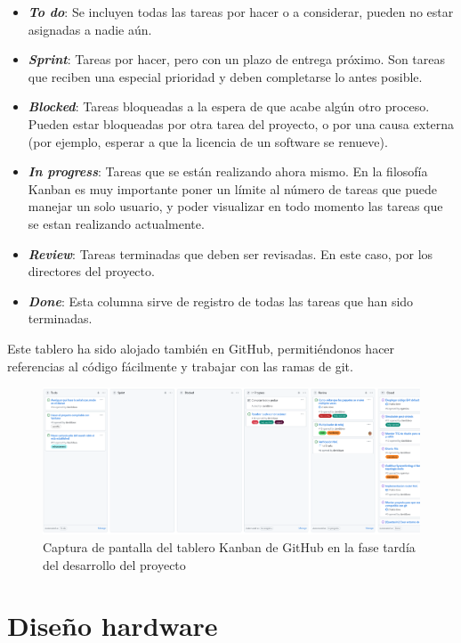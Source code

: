 \begin{itemize}
    \item \textbf{\textit{To do}}: Se incluyen todas las tareas por hacer o a considerar, pueden no estar asignadas a nadie aún.
    \item \textbf{\textit{Sprint}}: Tareas por hacer, pero con un plazo de entrega próximo. Son tareas que reciben una especial prioridad y deben completarse lo antes posible.
    \item \textbf{\textit{Blocked}}: Tareas bloqueadas a la espera de que acabe algún otro proceso. Pueden estar bloqueadas por otra tarea del proyecto, o por una causa externa (por ejemplo, esperar a que la licencia de un software se renueve).
    \item \textbf{\textit{In progress}}: Tareas que se están realizando ahora mismo. En la filosofía Kanban es muy importante poner un límite al número de tareas que puede manejar un solo usuario, y poder visualizar en todo momento las tareas que se estan realizando actualmente.
    \item \textbf{\textit{Review}}: Tareas terminadas que deben ser revisadas. En este caso, por los directores del proyecto.
    \item \textbf{\textit{Done}}: Esta columna sirve de registro de todas las tareas que han sido terminadas.
\end{itemize}

Este tablero ha sido alojado también en GitHub, permitiéndonos hacer referencias al código fácilmente y trabajar con las ramas de git.

\begin{figure}[h]
    \centering
    \includegraphics[width=\linewidth]{images/screencaps/github_kanban.png}
    \caption{Captura de pantalla del tablero Kanban de GitHub en la fase tardía del desarrollo del proyecto}
    \label{fig:screencap_kanban}
\end{figure}

\section{Diseño hardware}

